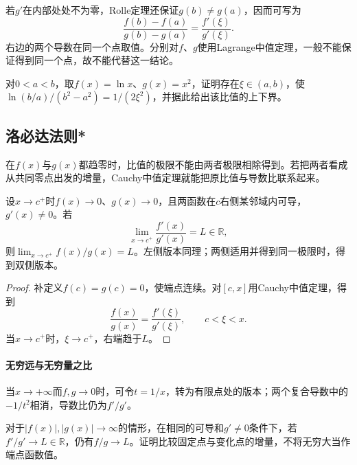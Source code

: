 若\(g'\)在内部处处不为零，Rolle定理还保证\(g(b)\ne g(a)\)，因而可写为
\begin{equation*}
 \frac{f(b)-f(a)}{g(b)-g(a)}=\frac{f'(\xi)}{g'(\xi)}.
\end{equation*}
右边的两个导数在同一个点取值。分别对\(f\)、\(g\)使用Lagrange中值定理，一般不能保证得到同一个点，故不能代替这一结论。

\begin{exercise}
对\(0<a<b\)，取\(f(x)=\ln x\)、\(g(x)=x^2\)，证明存在\(\xi\in(a,b)\)，使\(\ln(b/a)/(b^2-a^2)=1/(2\xi^2)\)，并据此给出该比值的上下界。
\end{exercise}

\subsection{洛必达法则*}

在\(f(x)\)与\(g(x)\)都趋零时，比值的极限不能由两者极限相除得到。若把两者看成从共同零点出发的增量，Cauchy中值定理就能把原比值与导数比联系起来。

\begin{theorem}[洛必达法则的\(0/0\)型]\label{thm:calculus-lhopital}
设\(x\to c^+\)时\(f(x)\to0\)、\(g(x)\to0\)，且两函数在\(c\)右侧某邻域内可导，\(g'(x)\ne0\)。若
\begin{equation*}
 \lim_{x\to c^+}\frac{f'(x)}{g'(x)}=L\in\mathbb R,
\end{equation*}
则\(\lim_{x\to c^+}f(x)/g(x)=L\)。左侧版本同理；两侧适用并得到同一极限时，得到双侧版本。
\end{theorem}

\begin{proof}
补定义\(f(c)=g(c)=0\)，使端点连续。对\([c,x]\)用Cauchy中值定理，得到
\begin{equation*}
 \frac{f(x)}{g(x)}=\frac{f'(\xi)}{g'(\xi)},\qquad c<\xi<x.
\end{equation*}
当\(x\to c^+\)时，\(\xi\to c^+\)，右端趋于\(L\)。
\end{proof}
\paragraph{无穷远与无穷量之比} \mbox{}

当\(x\to+\infty\)而\(f,g\to0\)时，可令\(t=1/x\)，转为有限点处的版本；两个复合导数中的\(-1/t^2\)相消，导数比仍为\(f'/g'\)。

对于\(|f(x)|,|g(x)|\to\infty\)的情形，在相同的可导和\(g'\ne0\)条件下，若\(f'/g'\to L\in\mathbb R\)，仍有\(f/g\to L\)。证明比较固定点与变化点的增量，不将无穷大当作端点函数值。

